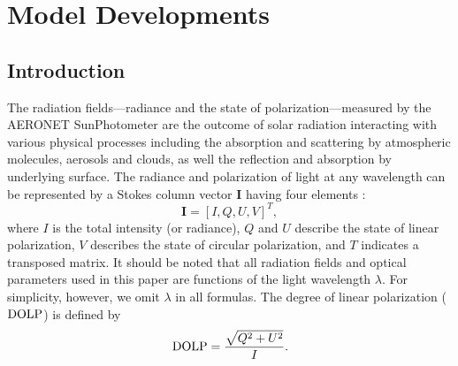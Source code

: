 \chapter{Model Developments} \label{ch:model}

\section{Introduction}

The radiation fields---radiance and the state of polarization---measured by the
AERONET SunPhotometer are the outcome of solar radiation interacting
with various physical processes including the absorption and
scattering by atmospheric molecules, aerosols and clouds, as well the
reflection and absorption by underlying surface. 
The radiance and polarization of light at any wavelength can be represented by
a Stokes column vector $\mathbf{I}$ having four elements \citep{Hansen74}:
\begin{equation}
\mathbf{I} = [I,Q,U,V]^T,
\end{equation}
where $I$ is the total intensity (or radiance), $Q$ and $U$ describe the state of
linear polarization, $V$ describes the state of circular polarization, and $T$
indicates a transposed matrix. It should be noted that all radiation fields and
optical parameters used in this paper are functions of the light wavelength
$\lambda$. For simplicity, however, we omit $\lambda$ in all formulas. 
The degree of linear polarization ($\text{DOLP}$) is defined by
\begin{equation}
\text{DOLP} = \frac{\sqrt{Q^2+U^2}}{I}. \label{eq:dolp}
\end{equation}

